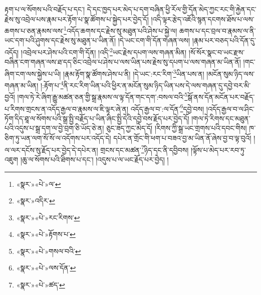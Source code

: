 རྟག་པ་ལ་སོགས་པའི་བརྗོད་པ་དང་། དེ་དང་ཁྱད་པར་མེད་པ་དག་བཞིན་ཕྱི་རོལ་གྱི་དོན་མེད་ཀྱང་རང་གི་རྐྱེན་དང་རྗེས་སུ་འབྲེལ་པས་རྣམ་པར་རྟོག་པ་སྣ་ཚོགས་པ་སྐྱེད་པར་བྱེད་དོ། །འདི་ལྟར་རྩེད་འཇོའི་སྙན་དངགས་ཐོས་པ་ལས་ཆགས་པ་ཅན་རྣམས་ལས་\footnote{«སྣར་»«པེ་»ལ་}འདོད་ཆགས་དང་རྗེས་སུ་མཐུན་པའི་ཤེས་པ་སྐྱེ་ལ། ཆགས་པ་དང་བྲལ་བ་རྣམས་ལ་ནི་ཡང་དག་པའི་ཤུགས་དང་རྗེས་སུ་མཐུན་པ་ཡིན་ནོ། །དེ་ཡང་ངག་གི་དོན་གཞན་ལས། །རྣམ་པར་བཅད་པའི་དོན་དུ་འདོད། །འབྲེལ་པར་ཤེས་པའི་ངག་གི་དོན། །འདི་\footnote{«སྣར་»འདིར་}ཡང་རྗེས་དཔག་ལས་གཞན་མིན། །སོ་སོར་སྣང་བ་ཡང་རྫས་བཞིན་ངག་གཞན་ལས་ཐ་དད་ཅིང་འབྲེལ་པ་ཤེས་པ་ལས་ཡིན་པས་རྗེས་སུ་དཔག་པ་ལས་གཞན་མ་ཡིན་ནོ། །གང་ཞིག་ངག་ལས་སྐྱེས་པ་ཡི། །རྣམ་རྟོག་སྣ་ཚོགས་ཤེས་པ་ནི། །དེ་ཡང་:རང་རིག་\footnote{«སྣར་»«པེ་»རང་རིགས་}ཡིན་པས་ན། །མངོན་སུམ་ཉིད་ལས་གཞན་མ་ཡིན། །:རྟོག་པ་\footnote{«སྣར་»«པེ་»རྟོགས་པ་}ནི་རང་རིག་ཡིན་པའི་ཕྱིར་ན་མངོན་སུམ་ཉིད་ཡིན་པས་དེ་ལས་གཞན་དུ་དབྱེ་བར་མི་བྱའོ། །གལ་ཏེ་རེ་ཞིག་རྒྱུ་མཚན་ཅན་གྱི་སྒྲ་རྣམས་ལ་ལྟ་དོན་གང་དག་:བསལ་བའི་\footnote{«སྣར་»«པེ་»གསལ་བའི་}སྒོ་ནས་དོན་མངོན་པར་བརྗོད་པ་རིགས་གྲངས་ན་འདོད་རྒྱལ་བ་རྣམས་ལ་ཇི་ལྟར་ཞེ་ན། འདོད་རྒྱལ་བ་:ལ་དོན་\footnote{«སྣར་»«པེ་»ལས་དོན་}དབྱེ་བས། །འདོད་རྒྱལ་བ་ལ་ཤིང་ཏོག་དིད་ཐཱ་ལ་སོགས་པའི་སྒྲ་སྤྱི་བརྗོད་པ་ཡིན་ཞིང་སྤྱི་དེའི་དབྱེ་བས་རྗོད་པར་བྱེད་དོ། །གལ་ཏེ་རིགས་དང་མཐུན་པའི་འདུས་པ་སྒྲ་དག་ལ་བྱེ་བྲག་ཅི་ཡོད་ཅེ་ན། ཅུང་ཟད་ཀྱང་མེད་དོ། །རིགས་ཀྱི་སྒྲ་ཡང་གྲགས་པའི་དབང་གིས། ཁ་ཅིག་ཏུ་ཡན་ལག་སོ་སོ་ལ་འདོགས་པར་འདོད་དེ། དཔེར་ན་གྲོང་གི་ཕག་པ་བཟའ་བྱ་མ་ཡིན་ནོ་ཞེས་བྱ་བ་ལྟ་བུའོ། །ལ་ལར་དངོས་སུ་རྗོད་པར་བྱེད་དེ་དཔེར་ན། གྲངས་དང་མཚན་\footnote{«སྣར་»«པེ་»ཚད་}ཉིད་དང་ནི་དབྱིབས། །ལྟོས་པ་མེད་པར་རབ་ཏུ་འཇུག །ཆུ་ལ་སོགས་པའི་ཐིགས་པ་དང་། །འདུས་པ་ལ་ཡང་རྗོད་པར་བྱེད། །
